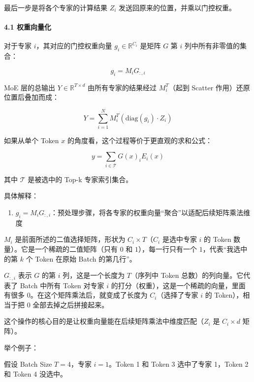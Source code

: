 最后一步是将各个专家的计算结果 \(Z_i\) 发送回原来的位置，并乘以门控权重。

\hypertarget{ux6743ux91cdux5411ux91cfux5316}{%
\paragraph{4.1 权重向量化}\label{ux6743ux91cdux5411ux91cfux5316}}

对于专家 \(i\)，其对应的门控权重向量 \(g_i \in \mathbb{R}^{C_i}\) 是矩阵 \(G\) 第 \(i\) 列中所有非零值的集合：

\[
g_i = M_iG_{:,i}
\]

MoE 层的总输出 \(Y \in \mathbb{R}^{T \times d}\) 由所有专家的结果经过 \(M_i^T\)（起到 Scatter 作用）还原位置后叠加而成：

\[
Y = \sum_{i=1}^{N} M_i^T(\mathrm{diag}(g_i) \cdot Z_i)
\]

如果从单个 Token \(x\) 的角度看，这个过程等价于更直观的求和公式：

\[
y = \sum_{i \in \mathcal{T}} G(x)_iE_i(x)
\]

其中 \(\mathcal{T}\) 是被选中的 Top-k 专家索引集合。

具体解释：

\begin{enumerate}
\def\labelenumi{\arabic{enumi}.}
\tightlist
\item
  \(g_i=M_iG_{:,i}\)：预处理步骤，将各专家的权重向量``聚合''以适配后续矩阵乘法维度
\end{enumerate}

\(M_i\) 是前面所述的二值选择矩阵，形状为 \(C_i\times T\)（\(C_i\) 是选中专家 \(i\) 的 Token 数量）。它是一个稀疏的二值矩阵（只有 \(0\) 和 \(1\)），每一行只有一个 \(1\)，代表``我选中的第 \(k\) 个 Token 在原始 Batch 的第几行''。

\(G_{:,i}\) 表示 \(G\) 的第 \(i\) 列，这是一个长度为 \(T\)（序列中 Token 总数）的列向量。它代表了 Batch 中所有 Token 对专家 \(i\) 的打分（权重），这是一个稀疏的向量，里面有很多 \(0\)。在这个矩阵乘法后，就变成了长度为 \(C_i\)（选择了专家 \(i\) 的 Token），相当于把 \(0\) 全部去掉之后拼接起来。

这个操作的核心目的是让权重向量能在后续矩阵乘法中维度匹配（\(Z_i\) 是 \(C_i\times d\) 矩阵）。

举个例子：

假设 Batch Size \(T=4\)，专家 \(i=1\)。Token 1 和 Token 3 选中了专家 1，Token 2 和 Token 4 没选中。


